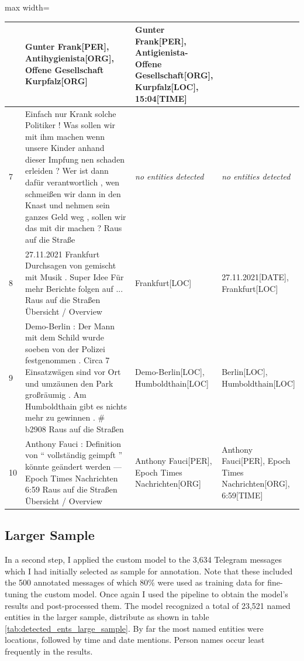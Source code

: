 \begin{table}[htp]
\begin{adjustbox}{max width=\textwidth}
\begin{tabular}{|p{0.04\linewidth}|p{0.6\linewidth}|p{0.3\linewidth}|p{0.35\linewidth}|}
& Gunter Frank[PER], Antihygienista[ORG], Offene Gesellschaft Kurpfalz[ORG]
& Gunter Frank[PER], Antigienista- Offene Gesellschaft[ORG], Kurpfalz[LOC], 15:04[TIME]\\ 
\hline
7 
& Einfach nur Krank solche Politiker ! Was sollen wir mit ihm machen wenn unsere Kinder anhand dieser Impfung nen schaden erleiden ? Wer ist dann dafür verantwortlich , wen schmeißen wir dann in den Knast und nehmen sein ganzes Geld weg , sollen wir das mit dir machen ? Raus auf die Straße 
& \textit{no entities detected}
& \textit{no entities detected}\\ 
\hline
8 
& 27.11.2021 Frankfurt Durchsagen von gemischt mit Musik . Super Idee   Für mehr Berichte folgen auf ... Raus auf die Straßen   \"Ubersicht / Overview 
& Frankfurt[LOC]
& 27.11.2021[DATE], Frankfurt[LOC]\\ 
\hline
9 
& Demo-Berlin : Der Mann mit dem Schild wurde soeben von der Polizei festgenommen . Circa 7 Einsatzwägen sind vor Ort und umzäunen den Park großräumig . Am Humboldthain gibt es nichts mehr zu gewinnen . \# b2908 Raus auf die Straßen 
& Demo-Berlin[LOC], Humboldthain[LOC]
& Berlin[LOC], Humboldthain[LOC]\\ 
\hline
10 
& Anthony Fauci : Definition von `` vollständig geimpft '' könnte geändert werden — Epoch Times Nachrichten 6:59 Raus auf die Straßen   \"Ubersicht / Overview 
& Anthony Fauci[PER], Epoch Times Nachrichten[ORG]
& Anthony Fauci[PER], Epoch Times Nachrichten[ORG], 6:59[TIME]
\\ \hline
\end{tabular}
\end{adjustbox}
\end{table}


\subsection{Larger Sample}
In a second step, I applied the custom model to the 3,634 Telegram messages which I had initially selected as sample for annotation. Note that these included the 500 annotated messages of which 80\% were used as training data for fine-tuning the custom model.
Once again I used the pipeline to obtain the model's results and post-processed them. The model recognized a total of 23,521 named entities in the larger sample, distribute as shown in table \ref{tab:detected_ents_large_sample}. By far the most named entities were locations, followed by time and date mentions. Person names occur least frequently in the results. 

